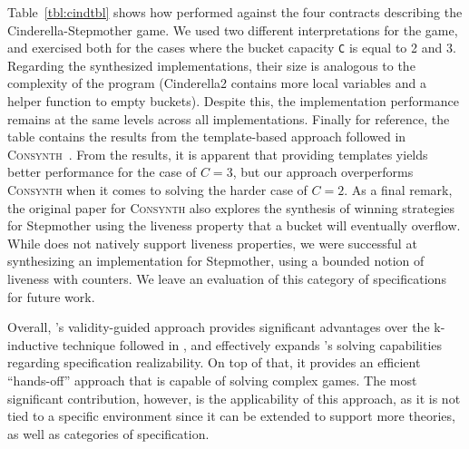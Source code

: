 Table~\ref{tbl:cindtbl} shows how \jsynvg performed against the four contracts describing the Cinderella-Stepmother game. We used two different interpretations for the game, and exercised both for the cases where the bucket capacity  \texttt{C} is equal to 2 and 3. Regarding the synthesized implementations, their size is analogous to the complexity of the program (Cinderella2 contains more local variables and a helper function to empty buckets). Despite this, the implementation performance remains at the same levels across all implementations. Finally for reference, the table contains the results from the template-based approach followed in \textsc{Consynth}~\cite{beyene2014constraint}. From the results, it is apparent that providing templates yields better performance for the case of $C = 3$, but our approach overperforms \textsc{Consynth} when it comes to solving the harder case of $C = 2$. As a final remark, the original paper for \textsc{Consynth} also explores the synthesis of winning strategies for Stepmother using the liveness property that a bucket will eventually overflow. While \jkind does not natively support liveness properties, we were successful at synthesizing an implementation for Stepmother, using a bounded notion of liveness with counters. We leave an evaluation of this category of specifications for future work.

Overall, \jsynvg's validity-guided approach provides significant advantages
over the k-inductive technique followed in \jsyn, and effectively expands
\jkind's solving capabilities regarding specification realizability. On top of that, it provides an efficient ``hands-off'' approach that is capable of solving complex games.
The most significant contribution, however, is the applicability of this approach, as it is not tied to a specific environment since it can be extended to support more
theories, as well as categories of specification.